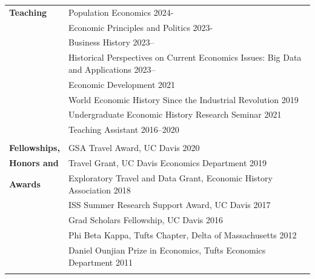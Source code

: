 \documentclass[a4paper,11pt,oneside]{article}
\begin{document}
\begin{longtable}{@{} p{0.175\linewidth} p{0.775\linewidth} p{0.05\linewidth}}
   



 
   \\
   \textbf{\large{Teaching}}&  \multicolumn{2}{l}{Population Economics  \hfill 2024- }\\ & 
    \multicolumn{2}{l}{Economic  Principles and Politics \hfill 2023- }\\
     &  \multicolumn{2}{l}{Business History  \hfill 2023--}\\
     &  \multicolumn{2}{l}{Historical Perspectives on Current Economics Issues: Big Data and Applications  \hfill 2023--}\\
   &  \multicolumn{2}{l}{Economic Development  \hfill 2021 }\\
   &  \multicolumn{2}{l}{ World Economic History Since the Industrial Revolution \hfill 2019}\\
   &  \multicolumn{2}{l}{Undergraduate Economic History Research Seminar \hfill  2021} \\
   &  \multicolumn{2}{l}{Teaching Assistant 2016--2020}\\
   
   \\
   
   \textbf{\large{Fellowships,}}   &   \multicolumn{2}{l}{GSA Travel Award, UC Davis  \hfill  2020}\\
   \textbf{\large{Honors and }}   &  \multicolumn{2}{l}{ Travel Grant, UC Davis Economics Department \hfill 2019}\\  
   \textbf{\large{Awards}}  &  \multicolumn{2}{l}{ Exploratory Travel and Data Grant, Economic History Association \hfill 2018}\\
   &  \multicolumn{2}{l}{ ISS Summer Research Support Award, UC Davis \hfill 2017}\\
   &  \multicolumn{2}{l}{ Grad Scholars Fellowship, UC Davis \hfill  2016}\\
   &  \multicolumn{2}{l}{ Phi Beta Kappa, Tufts Chapter, Delta of Massachusetts \hfill 2012}\\
   &   \multicolumn{2}{l}{ Daniel Ounjian Prize in Economics, Tufts Economics Department \hfill 2011}\\
   \\
   

\end{longtable}
\end{document}
